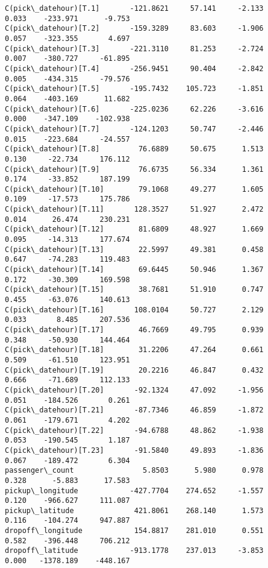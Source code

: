 \documentclass[11pt]{article}
\begin{document}
\begin{Verbatim}[commandchars=\\\{\}]
C(pick\_datehour)[T.1]       -121.8621     57.141     -2.133      0.033    -233.971      -9.753
C(pick\_datehour)[T.2]       -159.3289     83.603     -1.906      0.057    -323.355       4.697
C(pick\_datehour)[T.3]       -221.3110     81.253     -2.724      0.007    -380.727     -61.895
C(pick\_datehour)[T.4]       -256.9451     90.404     -2.842      0.005    -434.315     -79.576
C(pick\_datehour)[T.5]       -195.7432    105.723     -1.851      0.064    -403.169      11.682
C(pick\_datehour)[T.6]       -225.0236     62.226     -3.616      0.000    -347.109    -102.938
C(pick\_datehour)[T.7]       -124.1203     50.747     -2.446      0.015    -223.684     -24.557
C(pick\_datehour)[T.8]         76.6889     50.675      1.513      0.130     -22.734     176.112
C(pick\_datehour)[T.9]         76.6735     56.334      1.361      0.174     -33.852     187.199
C(pick\_datehour)[T.10]        79.1068     49.277      1.605      0.109     -17.573     175.786
C(pick\_datehour)[T.11]       128.3527     51.927      2.472      0.014      26.474     230.231
C(pick\_datehour)[T.12]        81.6809     48.927      1.669      0.095     -14.313     177.674
C(pick\_datehour)[T.13]        22.5997     49.381      0.458      0.647     -74.283     119.483
C(pick\_datehour)[T.14]        69.6445     50.946      1.367      0.172     -30.309     169.598
C(pick\_datehour)[T.15]        38.7681     51.910      0.747      0.455     -63.076     140.613
C(pick\_datehour)[T.16]       108.0104     50.727      2.129      0.033       8.485     207.536
C(pick\_datehour)[T.17]        46.7669     49.795      0.939      0.348     -50.930     144.464
C(pick\_datehour)[T.18]        31.2206     47.264      0.661      0.509     -61.510     123.951
C(pick\_datehour)[T.19]        20.2216     46.847      0.432      0.666     -71.689     112.133
C(pick\_datehour)[T.20]       -92.1324     47.092     -1.956      0.051    -184.526       0.261
C(pick\_datehour)[T.21]       -87.7346     46.859     -1.872      0.061    -179.671       4.202
C(pick\_datehour)[T.22]       -94.6788     48.862     -1.938      0.053    -190.545       1.187
C(pick\_datehour)[T.23]       -91.5840     49.893     -1.836      0.067    -189.472       6.304
passenger\_count                5.8503      5.980      0.978      0.328      -5.883      17.583
pickup\_longitude            -427.7704    274.652     -1.557      0.120    -966.627     111.087
pickup\_latitude              421.8061    268.140      1.573      0.116    -104.274     947.887
dropoff\_longitude            154.8817    281.010      0.551      0.582    -396.448     706.212
dropoff\_latitude            -913.1778    237.013     -3.853      0.000   -1378.189    -448.167

\end{Verbatim}
\end{document}
